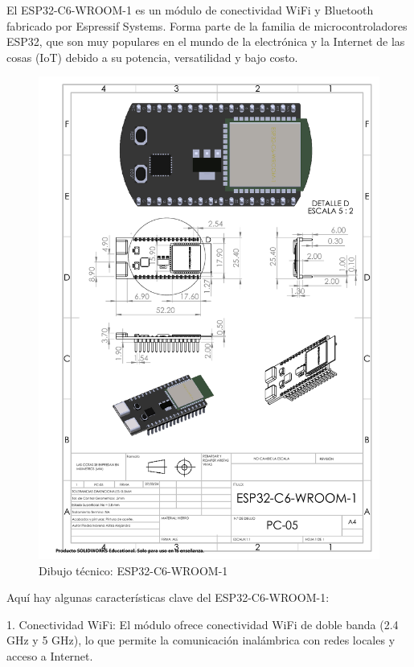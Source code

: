     El ESP32-C6-WROOM-1 es un módulo de conectividad WiFi y Bluetooth fabricado por Espressif Systems. Forma parte de la familia de microcontroladores ESP32, que son muy populares en el mundo de la electrónica y la Internet de las cosas (IoT) debido a su potencia, versatilidad y bajo costo.
    \begin{figure}[H]
        \centering
        \includegraphics[trim = {7mm 1mm 1mm 1mm},clip,scale=0.4]{22/Img/esp32Dibujo.pdf}
        \caption{Dibujo técnico: ESP32-C6-WROOM-1}
        \label{fig:esp}
    \end{figure}
    
    Aquí hay algunas características clave del ESP32-C6-WROOM-1:
    
    1. Conectividad WiFi: El módulo ofrece conectividad WiFi de doble banda (2.4 GHz y 5 GHz), lo que permite la comunicación inalámbrica con redes locales y acceso a Internet.
    
